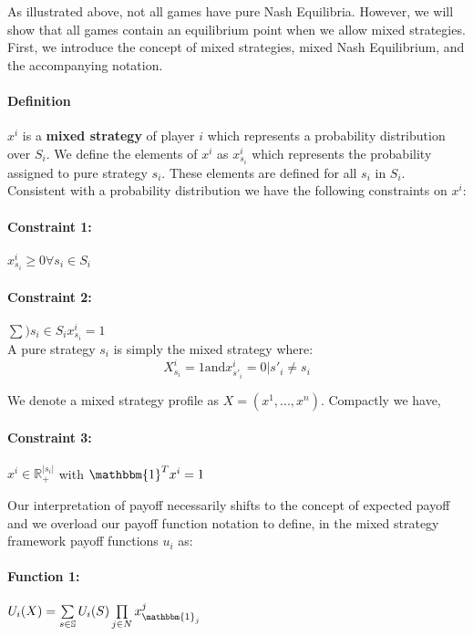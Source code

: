 \documentclass[12pt]{article}
\newcommand{\Definition}{\paragraph{Definition}}
\begin{document}
As illustrated above, not all games have pure Nash Equilibria. However, we will show that all games contain an equilibrium point when we allow mixed strategies. First, we introduce the concept of mixed strategies, mixed Nash Equilibrium, and the accompanying notation.

\Definition $x^i$ is a \textbf{mixed strategy} of player $i$ which represents a probability distribution over $S_i$. We define the elements of $x^i$ as $x^i_{s_i}$ which represents the probability assigned to pure strategy $s_i$. These elements are defined for all $s_i$ in $S_i$.\\

Consistent with a probability distribution we have the following constraints on $x^i$:

\paragraph{Constraint 1:} $x^i_{s_i} \geq 0 \forall s_i \in S_i$

\paragraph{Constraint 2:} $\sum\limits){s_i \in S_i} x^i_{s_i} = 1$\\

A pure strategy $s_i$ is simply the mixed strategy where:
\begin{equation*}
	X^i_{s_i} = 1 \text{and} x^i_{s'_i} = 0 | s'_i \neq s_i
\end{equation*}

We denote a mixed strategy profile as $X = (x^1, ... , x^n)$. Compactly we have,

\paragraph{Constraint 3:}  $x^i \in \mathbb{R}^{|s_i|}_+$ with $\mathbbm{1}^T x^i = 1$

Our interpretation of payoff necessarily shifts to the concept of expected payoff and we overload our payoff function notation to define, in the mixed strategy framework payoff functions $u_i$ as:

\paragraph{Function 1:} $U_i(X) = \sum\limits_{s \in \mathbb{S}} U_i(S)\prod\limits_{j \in N} x^j_{\mathbbm{1}_j}$\\
\end{document}
